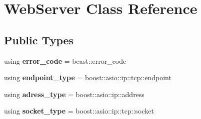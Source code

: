 \hypertarget{classWebServer}{}\section{Web\+Server Class Reference}
\label{classWebServer}
\subsection*{Public Types}
\begin{DoxyCompactItemize}
\item 
using {\bfseries error\+\_\+code} = beast\+::error\+\_\+code\hypertarget{classWebServer_a155eb963b3d38e6da8417ce419c473ea}{}\label{classWebServer_a155eb963b3d38e6da8417ce419c473ea}

\item 
using {\bfseries endpoint\+\_\+type} = boost\+::asio\+::ip\+::tcp\+::endpoint\hypertarget{classWebServer_af640ab22d065881d537c01582ed937b5}{}\label{classWebServer_af640ab22d065881d537c01582ed937b5}

\item 
using {\bfseries adress\+\_\+type} = boost\+::asio\+::ip\+::address\hypertarget{classWebServer_a56619120911c048b0c243be45a7cac0e}{}\label{classWebServer_a56619120911c048b0c243be45a7cac0e}

\item 
using {\bfseries socket\+\_\+type} = boost\+::asio\+::ip\+::tcp\+::socket\hypertarget{classWebServer_a9eda15e10001b955e89ca4d8f11ddf6f}{}\label{classWebServer_a9eda15e10001b955e89ca4d8f11ddf6f}

\end{DoxyCompactItemize}
